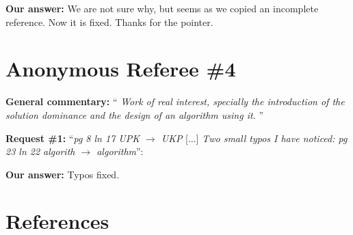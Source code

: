 \documentclass{elsarticle}
\begin{document}
\textbf{Our answer:} We are not sure why, but seems as we copied an incomplete reference. Now it is fixed. Thanks for the pointer.

\section{Anonymous Referee \#4}

\textbf{General commentary:} ``\textit{
Work of real interest, specially the introduction of the solution dominance and the design of an algorithm using it.
}''

\textbf{Request \#1:} ``\textit{pg 8 ln 17 UPK \(\rightarrow\) UKP} [...] \textit{Two small typos I have noticed: pg 23 ln 22 algorith \(\rightarrow\) algorithm}'':

\textbf{Our answer:} Typos fixed.

\section{References}

%

\end{document}
